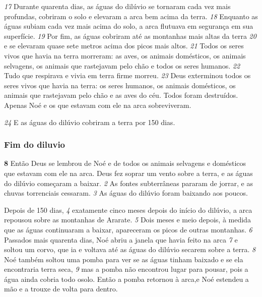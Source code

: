 \bigskip
\textit{\tiny 17}
 Durante quarenta dias, as águas do dilúvio se tornaram cada vez mais profundas, cobriram o solo e elevaram a arca bem acima da terra. 
\textit{\tiny 18}
 Enquanto as águas subiam cada vez mais acima do solo, a arca flutuava em segurança em sua superfície. 
\textit{\tiny 19}
 Por fim, as águas cobriram até as montanhas mais altas da terra 
\textit{\tiny 20}
 e se elevaram quase sete metros acima dos picos mais altos. 
\textit{\tiny 21}
 Todos os seres vivos que havia na terra morreram: as aves, os animais domésticos, os animais selvagens, os animais que rastejavam pelo chão e todos os seres humanos. 
\textit{\tiny 22}
 Tudo que respirava e vivia em terra firme morreu. 
\textit{\tiny 23}
 Deus exterminou todos os seres vivos que havia na terra: os seres humanos, os animais domésticos, os animais que rastejavam pelo chão e as aves do céu. Todos foram destruídos. Apenas Noé e os que estavam com ele na arca sobreviveram.



\bigskip
\textit{\tiny 24}
 E as águas do dilúvio cobriram a terra por 150 dias.



\bigskip
\subsubsection*{Fim do diluvio}
\textbf{\large 8}
 Então Deus se lembrou de Noé e de todos os animais selvagens e domésticos que estavam com ele na arca. Deus fez soprar um vento sobre a terra, e as águas do dilúvio começaram a baixar. 
\textit{\tiny 2}
 As fontes subterrâneas pararam de jorrar, e as chuvas torrenciais cessaram. 
\textit{\tiny 3}
 As águas do dilúvio foram baixando aos poucos.

\bigskip
Depois de 150 dias, 
\textit{\tiny 4}
 exatamente cinco meses depois do início do dilúvio, a arca repousou sobre as montanhas de Ararate. 
\textit{\tiny 5}
 Dois meses e meio depois, à medida que as águas continuaram a baixar, apareceram os picos de outras montanhas. 
\textit{\tiny 6}
 Passados mais quarenta dias, Noé abriu a janela que havia feito na arca 
\textit{\tiny 7}
 e soltou um corvo, que ia e voltava até as águas do dilúvio secarem sobre a terra. 
\textit{\tiny 8}
 Noé também soltou uma pomba para ver se as águas tinham baixado e se ela encontraria terra seca, 
\textit{\tiny 9}
 mas a pomba não encontrou lugar para pousar, pois a água ainda cobria todo osolo. Então a pomba retornou à arca,e Noé estendeu a mão e a trouxe de volta para dentro.


